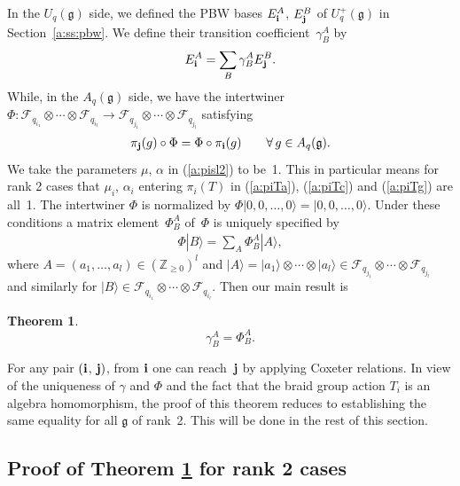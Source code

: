 \documentclass[11pt]{article}
\newtheorem{theorem}{Theorem}
\newcommand{\geh}{\mathfrak{g}}
\newcommand{\Z}{{\mathbb Z}}
\begin{document}
In the $U_q(\geh)$ side, we def\/ined
the PBW bases
$E_{\bf i}^A$, $E_{\bf j}^B$ of $U_q^+(\geh)$ in Section~\ref{a:ss:pbw}.
We def\/ine their transition coef\/f\/icient~$\gamma^A_B$ by
\begin{gather*}
E_{\bf i}^A=\sum_B \gamma^A_B E_{\bf j}^B.
\end{gather*}
While, in the $A_q(\geh)$ side, we have the intertwiner
$\Phi:
\mathcal{F}_{q_{i_1}}\otimes \cdots \otimes \mathcal{F}_{q_{i_l}}
\rightarrow
\mathcal{F}_{q_{j_1}}\otimes \cdots \otimes \mathcal{F}_{q_{j_l}}$
satisfying
\begin{gather}\label{a:piphi}
\pi_{\bf j}(g)\circ \Phi = \Phi \circ \pi_{\bf i}(g)\qquad
\forall\, g \in A_q(\mathfrak{g}).
\end{gather}
We take the parameters
$\mu$, $\alpha$ in (\ref{a:pisl2}) to be~1.
This in particular means for rank 2 cases that $\mu_i$, $\alpha_i$
entering $\pi_i(T)$ in (\ref{a:piTa}), (\ref{a:piTc}) and
(\ref{a:piTg}) are all~1.
The intertwiner $\Phi$ is normalized
by $\Phi |0,0,\ldots, 0\rangle =  |0,0,\ldots, 0\rangle$.
Under these conditions a matrix element~$\Phi^A_B$ of~$\Phi$
is uniquely specif\/ied by
\begin{gather*}
\Phi |B\rangle=\sum_A \Phi^A_B |A\rangle,
\end{gather*}
where $A=(a_1, \ldots, a_l) \in (\Z_{\ge 0})^l$ and
$|A\rangle = |a_1\rangle \otimes \cdots \otimes |a_l\rangle
\in \mathcal{F}_{q_{j_1}}\otimes \cdots \otimes \mathcal{F}_{q_{j_l}}$
and similarly for $|B\rangle
\in \mathcal{F}_{q_{i_1}}\otimes \cdots \otimes \mathcal{F}_{q_{i_l}}$.
Then our main result is
\begin{theorem}\label{theorem:gamma=R}
\[
\gamma^A_B=\Phi^A_B.
\]
\end{theorem}

For any pair $({\bf i}$, ${\bf j})$, from ${\bf i}$ one can reach~${\bf j}$ by applying Coxeter relations.
In view of the uniqueness of $\gamma$ and $\Phi$
and the fact that
the braid group action $T_i$ is an algebra homomorphism,
the proof of this theorem reduces to
establishing the same equality for all $\geh$ of rank~2.
This will  be done in the rest of this section.

\subsection{Proof of Theorem \ref{theorem:gamma=R} for rank 2 cases}
\end{document}
